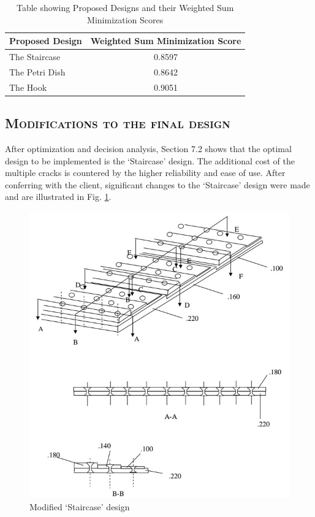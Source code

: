 \documentclass[12pt]{article}
\begin{document}
\begin{table}[h!]   
\begin{center}
    \begin{tabular}{ | l | c |}
    \hline
    Proposed Design & Weighted Sum Minimization Score  \\ \hline
    The Staircase & 0.8597    \\ \hline
    The Petri Dish & 0.8642    \\ \hline
    The Hook & 0.9051    \\ \hline
	\end{tabular}
\caption{Table showing Proposed Designs and their Weighted Sum Minimization Scores}
\label{results}    
\end{center}
\end{table}

\subsection{\textsc{Modifications to the final design}}

After optimization and decision analysis, Section 7.2 shows that the optimal design to be implemented is the `Staircase' design. The additional cost of the multiple cracks is countered by the higher reliability and ease of use. After conferring with the client, significant changes to the `Staircase' design were made and are illustrated in Fig. \ref{fig:staircase_mod}.

\begin{figure}[h!]
  \centering
  	\includegraphics[width=\textwidth]{staircase_mod}
  \caption{Modified `Staircase' design}
  \label{fig:staircase_mod}
\end{figure}
\end{document}
